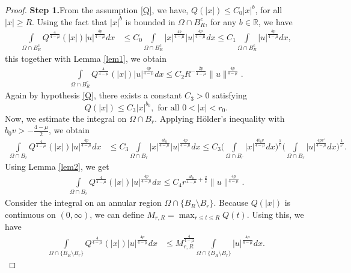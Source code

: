 \documentclass[11pt]{amsart}
\numberwithin{equation}{section}
\newenvironment{step}[1]{\par\noindent\textbf{Step 1.}\space#1}{}
\newcommand{\R}{\mathbb{R}}
\newcommand{\1}{\frac{1}{2}}
\begin{document}
\begin{proof}
\begin{step}
			From the assumption \eqref{Q}, we have, $Q(|x|) \leq C_0 |x|^b$, for all $|x| \geq R$. Using the fact that $|x|^b$ is bounded in $\Omega \cap B_R^c$, for any $b\in \R$, we have
			\begin{align*}
				\int\limits_{\Omega \cap B_R^c } Q^{\frac{4}{4-\mu}}(|x|) |u|^{\frac{4p}{4-\mu}}dx &\leq C_0\int\limits_{\Omega \cap B_R^c } |x|^{\frac{4b}{4-\mu}} |u|^{\frac{4p}{4-\mu}}dx 
				\leq C_1 \int\limits_{\Omega \cap B_R^c }|u|^{\frac{4p}{4-\mu}}dx,
			\end{align*}
			this together with Lemma \ref{lem1}, we obtain
			\begin{align}
				\label{2.2}
				\int\limits_{\Omega \cap B_R^c } Q^{\frac{4}{4-\mu}}(|x|) |u|^{\frac{4p}{4-\mu}}dx\leq C_2 R^{-\frac{2p}{4-\mu}}\|u\|^{\frac{4p}{4-\mu}}.
			\end{align}
			Again by hypothesis \eqref{Q}, there exists a constant $C_3>0$ satisfying
			\begin{equation*}
				Q(|x|) \leq C_3 |x|^{b_0} , \text{ for all } 0<|x|<r_0.
			\end{equation*}
			Now, we estimate the integral on $\Omega \cap B_r$. Applying H\"older's inequality with $b_0 v > -\frac{4-\mu}{2}$, we obtain 
			\begin{align}
				\int\limits_{\Omega \cap B_r } Q^{\frac{4}{4-\mu}}(|x|) |u|^{\frac{4p}{4-\mu}}dx &\leq C_3\int\limits_{\Omega \cap B_r } |x|^{\frac{4b_0}{4-\mu}} |u|^{\frac{4p}{4-\mu}}dx \leq C_3 \Bigg(\int\limits_{\Omega \cap B_r } |x|^{\frac{4b_0v}{4-\mu}}dx\Bigg)^{\frac{1}{v}} \Bigg( \int\limits_{\Omega \cap B_r } |u|^{\frac{4pv'}{4-\mu}}dx \Bigg)^{\frac{1}{v'}}. \nonumber
			\end{align}
			Using Lemma \ref{lem2}, we get
			\begin{align}
				\label{2.3}
				\int\limits_{\Omega \cap B_r } Q^{\frac{4}{4-\mu}}(|x|) |u|^{\frac{4p}{4-\mu}}dx
				\leq C_4 r^{\frac{4b_0}{4-\mu}+ \frac{2}{v}} \|u\|^{\frac{4p}{4-\mu}}.
			\end{align}
			Consider the integral on an annular region $\Omega \cap \{B_R \setminus B_r\}$. Because $Q(|x|)$ is continuous on $(0,\infty)$, we can define $M_{r,R} = \displaystyle\max_{r\leq t \leq R} Q(t)$. Using this, we have
			\begin{align}
				\label{2.4}
				\int\limits_{\Omega \cap \{B_R \setminus B_r\}} Q^{\frac{4}{4-\mu}}(|x|) |u|^{\frac{4p}{4-\mu}}dx &\leq M_{r,R}^{\frac{4}{4-\mu}} \int\limits_{\Omega \cap \{B_R \setminus B_r\}} |u|^{\frac{4p}{4-\mu}}dx.
			\end{align}

\end{step}
\end{proof}
\end{document}
